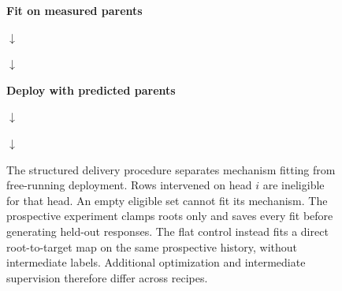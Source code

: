 \begin{figure}[t]
\centering
\begin{minipage}[t]{0.47\linewidth}
\centering\small
\textbf{Fit on measured parents}\par\medskip
{}
\par\smallskip$\downarrow$\par\smallskip
{}
\par\smallskip$\downarrow$\par\smallskip
{}
\end{minipage}\hfill
\begin{minipage}[t]{0.47\linewidth}
\centering\small
\textbf{Deploy with predicted parents}\par\medskip
{}
\par\smallskip$\downarrow$\par\smallskip
{}
\par\smallskip$\downarrow$\par\smallskip
{}
\end{minipage}
\caption{The structured delivery procedure separates mechanism fitting from
free-running deployment. Rows intervened on head $i$ are ineligible for that
head. An empty eligible set cannot fit its mechanism. The prospective experiment
clamps roots only and saves every fit before generating held-out responses.
The flat control instead fits a direct root-to-target map on the same prospective
history, without intermediate labels. Additional optimization and intermediate
supervision therefore differ across recipes.}
\label{fig:delivery-procedure}
\end{figure}
